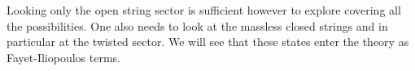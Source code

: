         Looking only the open string sector is sufficient however to explore covering all the possibilities. One also needs to look at the massless closed strings and in particular at the twisted sector. We will see that these states enter the theory as Fayet-Iliopoulos terms.




